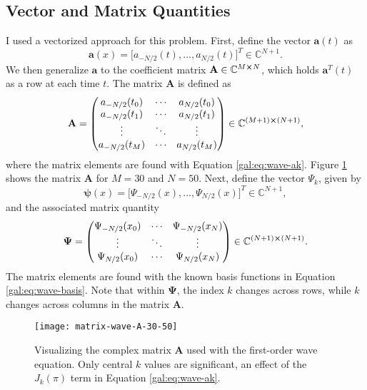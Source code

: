 \documentclass[11pt, a4paper]{article}
\newcommand{\mat}[1]{\mathbf{#1}}
\renewcommand{\vec}[1]{\bm{#1}}
\begin{document}
\subsection{Vector and Matrix Quantities}
I used a vectorized approach for this problem. First, define the vector $ \bm{a}(t) $ as
\begin{equation*}
		\bm{a}(x) = \big[a_{-N/2}(t), \ldots, a_{N/2}(t)\big]^{T} \in \mathbb{C}^{N+1}.
\end{equation*}
We then generalize $ \vec{a} $ to the coefficient matrix $ \mat{A} \in \mathbb{C}^{M \cross N} $, which holds $ \bm{a}^{T}(t) $ as a row at each time $ t $. The matrix $ \mat{A} $ is defined as 
\begin{equation*}
	\mat{A} = 
	\begin{pmatrix}
		a_{-N/2}(t_{0}) & \cdots & a_{N/2}(t_{0}) \\
		a_{-N/2}(t_{1}) & \cdots & a_{N/2}(t_{1}) \\
		\vdots & \ddots & \vdots\\
		a_{-N/2}(t_{M}) & \cdots & a_{N/2}(t_{M})
	\end{pmatrix}
	\in \mathbb{C}^{(M+1) \cross (N+1)},
\end{equation*}
where the matrix elements are found with Equation \ref{gal:eq:wave-ak}. Figure \ref{gal:fig:wave-A} shows the matrix $ \mat{A} $ for $ M = 30 $ and $ N = 50 $. Next, define the vector $ \Psi_{k} $, given by
\begin{equation*}
	\bm{\psi}(x) = \big[\Psi_{-N/2}(x), \ldots, \Psi_{N/2}(x)\big]^{T} \in \mathbb{C}^{N+1},
\end{equation*}
and the associated matrix quantity
\begin{equation*}
	\mat{\Psi} = 
	\begin{pmatrix}
		\Psi_{-N/2}(x_{0}) & \cdots & \Psi_{-N/2}(x_{N}) \\
		\vdots & \ddots & \vdots \\
		\Psi_{N/2}(x_{0}) & \cdots & \Psi_{N/2}(x_{N}) 
	\end{pmatrix}
	\in \mathbb{C}^{(N+1) \cross (N+1)}.
\end{equation*}
The matrix elements are found with the known basis functions in Equation \ref{gal:eq:wave-basis}. Note that within $ \mat{\Psi} $, the index $ k $ changes across rows, while $ k $ changes across columns in the matrix $ \mat{A} $. 

\begin{figure}
\centering
\texttt{[image: matrix-wave-A-30-50]}
\caption{Visualizing the complex matrix $ \mat{A} $ used with the first-order wave equation. Only central $ k $ values are significant, an effect of the $ J_{k}(\pi) $ term in Equation \ref{gal:eq:wave-ak}.}
\label{gal:fig:wave-A}
\end{figure}
\end{document}

